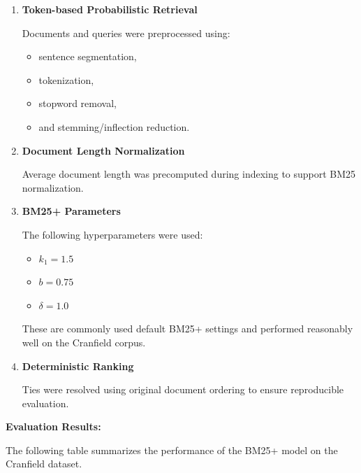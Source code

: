 \documentclass{article}
\begin{document}
\begin{enumerate}
    \item \textbf{Token-based Probabilistic Retrieval}

    Documents and queries were preprocessed using:
    \begin{itemize}
        \item sentence segmentation,
        \item tokenization,
        \item stopword removal,
        \item and stemming/inflection reduction.
    \end{itemize}

    \item \textbf{Document Length Normalization}

    Average document length was precomputed during indexing to support BM25 normalization.

    \item \textbf{BM25+ Parameters}

    The following hyperparameters were used:
    \begin{itemize}
        \item \(k_1 = 1.5\)
        \item \(b = 0.75\)
        \item \(\delta = 1.0\)
    \end{itemize}

    These are commonly used default BM25+ settings and performed reasonably well on the Cranfield corpus.

    \item \textbf{Deterministic Ranking}

    Ties were resolved using original document ordering to ensure reproducible evaluation.
\end{enumerate}

\textbf{Evaluation Results:}

The following table summarizes the performance of the BM25+ model on the Cranfield dataset.
\end{document}
